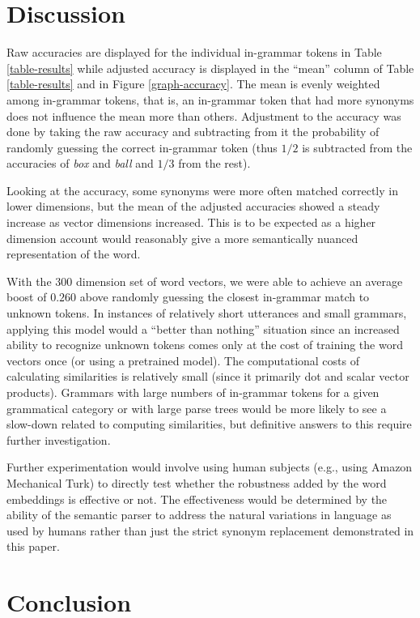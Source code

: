 \documentclass[a4paper]{article}
\begin{document}
\section{Discussion}

Raw accuracies are displayed for the individual in-grammar tokens in
Table \ref{table-results} while adjusted accuracy is displayed in the
``mean'' column of Table \ref{table-results} and in
Figure \ref{graph-accuracy}. The mean is evenly weighted among in-grammar
tokens, that is, an in-grammar token that had more synonyms does not
influence the mean more than others.
Adjustment to the accuracy was done by taking the raw accuracy
and subtracting from it
the probability of randomly guessing the correct in-grammar token
(thus $1/2$ is subtracted from the accuracies of \textit{box} and
\textit{ball} and $1/3$ from the rest).

Looking at the accuracy, some synonyms were more often matched
correctly in lower dimensions, but the mean of the adjusted accuracies
showed a steady increase as vector dimensions increased. This is to be
expected as a higher dimension account would reasonably give a more
semantically nuanced representation of the word.

With the $300$ dimension set of word vectors, we were able to achieve
an average boost of $0.260$ above randomly guessing the closest in-grammar
match to unknown tokens. In instances of relatively short utterances
and small grammars, applying this model would a ``better than nothing''
situation since an increased ability to recognize unknown tokens comes
only at the cost of training the word vectors once (or using a pretrained
model). The computational costs of calculating similarities is relatively
small (since it primarily dot and scalar vector products).
Grammars with large numbers of in-grammar tokens for a given grammatical
category or with large parse trees would be more likely to see a slow-down
related to computing similarities, but definitive answers to this require
further investigation.

Further experimentation would involve using human subjects (e.g., using
Amazon Mechanical Turk) to directly test whether the robustness added by the
word embeddings is effective or not.
The effectiveness would be determined by the ability of the semantic parser
to address the natural variations in language as used by humans rather than
just the strict synonym replacement demonstrated in this paper.

\section{Conclusion}
\end{document}

